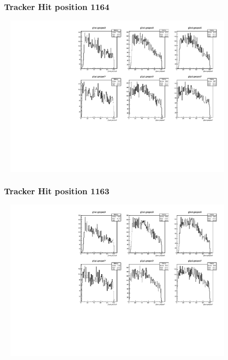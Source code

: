 \documentclass[slidestop,compress,mathserif]{beamer}
\begin{document}
\begin{frame}\frametitle{Tracker Hit position 1164}
	 \includegraphics[width=12cm,height=8cm]{Tracker_Hit_position_1164.pdf}
\end{frame}
\begin{frame}\frametitle{Tracker Hit position 1163}
	 \includegraphics[width=12cm,height=8cm]{Tracker_Hit_position_1163.pdf}
\end{frame}
\end{document}
